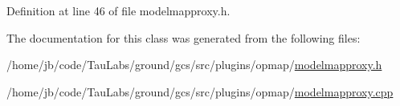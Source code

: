 \-Definition at line 46 of file modelmapproxy.\-h.



\-The documentation for this class was generated from the following files\-:\begin{DoxyCompactItemize}
\item 
/home/jb/code/\-Tau\-Labs/ground/gcs/src/plugins/opmap/\hyperlink{modelmapproxy_8h}{modelmapproxy.\-h}\item 
/home/jb/code/\-Tau\-Labs/ground/gcs/src/plugins/opmap/\hyperlink{modelmapproxy_8cpp}{modelmapproxy.\-cpp}\end{DoxyCompactItemize}
